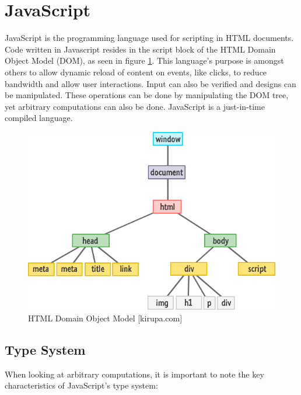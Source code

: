 \section{JavaScript} \label{chapter_javascript}

JavaScript is the programming language used for scripting in HTML documents. Code written in Javascript resides in the script block of the HTML Domain Object Model (DOM), as seen in figure \ref{fig:htmldom}. This language's purpose is amongst others to allow dynamic reload of content on events, like clicks, to reduce bandwidth and allow user interactions. Input can also be verified and designs can be manipulated. These operations can be done by manipulating the DOM tree, yet arbitrary computations can also be done. JavaScript is a just-in-time compiled language.

\begin{figure}[htp]
  \begin{center}
    \includegraphics[width=0.9\columnwidth]{resources/html_dom.png}
  \end{center}
  \caption{HTML Domain Object Model [kirupa.com]}
  \label{fig:htmldom}
\end{figure}


\subsection{Type System}

When looking at arbitrary computations, it is important to note the key characteristics of JavaScript's type system:

